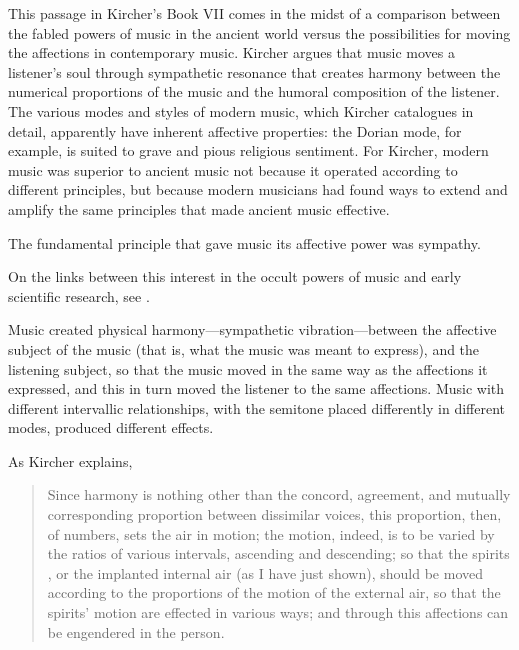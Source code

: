 This passage in Kircher's Book VII comes in the midst of a comparison between the fabled powers of music in the ancient world versus the possibilities for moving the affections in contemporary music.
Kircher argues that music moves a listener's soul through sympathetic resonance that creates harmony between the numerical proportions of the music and the humoral composition of the listener.
The various modes and styles of modern music, which Kircher catalogues in detail, apparently have inherent affective properties: the Dorian mode, for example, is suited to grave and pious religious sentiment.
For Kircher, modern music was superior to ancient music not because it operated according to different principles, but because modern musicians had found ways to extend and amplify the same principles that made ancient music effective.

The fundamental principle that gave music its affective power was sympathy.%
\begin{Footnote}
    On the links between this interest in the occult powers of music and early scientific research, see \autocites{Gouk:Sciences}{Gouk:Harmonics}.
\end{Footnote}
Music created physical harmony---sympathetic vibration---between the affective subject of the music (that is, what the music was meant to express), and the listening subject, so that the music moved in the same way as the affections it expressed, and this in turn moved the listener to the same affections.
Music with different intervallic relationships, with the semitone placed differently in different modes, produced different effects.

As Kircher explains, 
\begin{quote}
    Since harmony is nothing other than the concord, agreement, and mutually corresponding proportion between dissimilar voices,
    this proportion, then, of numbers, sets the air in motion;
    the motion, indeed, is to be varied by the ratios of various intervals, ascending and descending;
    so that the spirits , or the implanted internal air (as I have just shown), should be moved according to the proportions of the motion of the external air, so that the spirits' motion are effected in various ways; and through this affections can be engendered in the person.%
        \Autocite
        [552: .]
        {Kircher:Musurgia}
\end{quote}

